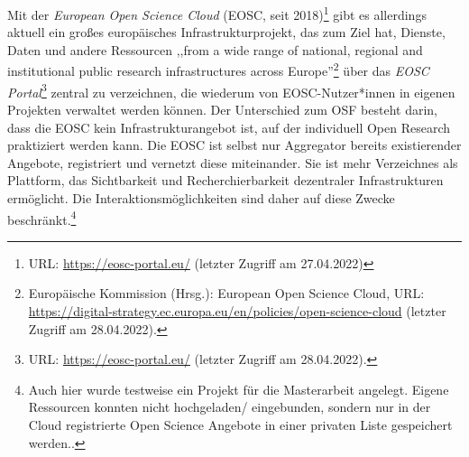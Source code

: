 \begin{enumerate}
Mit der \textit{European Open Science Cloud} (EOSC, seit 2018)\footnote{URL: \url{https://eosc-portal.eu/} (letzter Zugriff am 27.04.2022)} gibt es allerdings aktuell ein großes europäisches Infrastrukturprojekt, das zum Ziel hat, Dienste, Daten und andere Ressourcen ,,from a wide range of national, regional and institutional public research infrastructures across Europe''\footnote{Europäische Kommission (Hrsg.): European Open Science Cloud, URL: \url{https://digital-strategy.ec.europa.eu/en/policies/open-science-cloud} (letzter Zugriff am 28.04.2022).} über das \textit{EOSC Portal}\footnote{URL: \url{https://eosc-portal.eu/} (letzter Zugriff am 28.04.2022).} zentral zu verzeichnen, die wiederum von EOSC-Nutzer*innen in eigenen Projekten verwaltet werden können. Der Unterschied zum OSF besteht darin, dass die EOSC kein Infrastrukturangebot ist, auf der individuell Open Research praktiziert werden kann. Die EOSC ist selbst nur Aggregator bereits existierender Angebote, registriert und vernetzt diese miteinander. Sie ist mehr Verzeichnes als Plattform, das Sichtbarkeit und Recherchierbarkeit dezentraler Infrastrukturen ermöglicht. Die Interaktionsmöglichkeiten sind daher auf diese Zwecke beschränkt.\footnote{Auch hier wurde testweise ein Projekt für die Masterarbeit angelegt. Eigene Ressourcen konnten nicht hochgeladen/ eingebunden, sondern nur in der Cloud registrierte Open Science Angebote in einer privaten Liste gespeichert werden..}


\end{enumerate}

